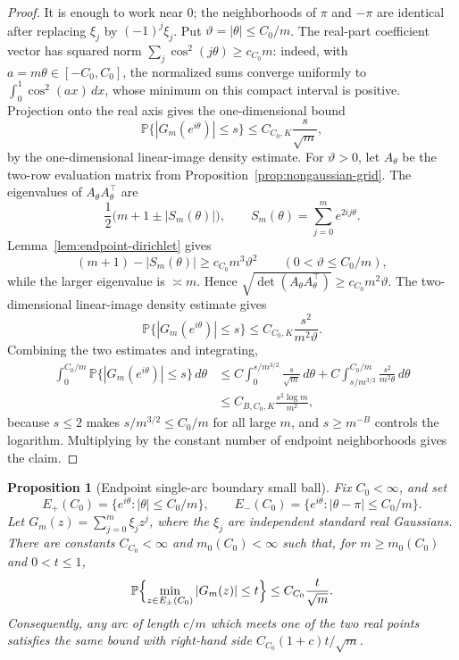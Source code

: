 \documentclass[11pt]{amsart}
\numberwithin{equation}{section}
\newtheorem{proposition}[theorem]{Proposition}
\theoremstyle{definition}
\theoremstyle{remark}
\newcommand{\Prob}{\mathbb P}
\newcommand{\abs}[1]{\left\lvert #1\right\rvert}
\begin{document}
\begin{proof}
It is enough to work near \(0\); the neighborhoods of \(\pi\) and \(-\pi\) are identical after replacing \(\xi_j\) by \((-1)^j\xi_j\). Put \(\vartheta=|\theta|\le C_0/m\). The real-part coefficient vector has squared norm \(\sum_j\cos^2(j\theta)\ge c_{C_0}m\): indeed, with \(a=m\theta\in[-C_0,C_0]\), the normalized sums converge uniformly to \(\int_0^1\cos^2(ax)\,dx\), whose minimum on this compact interval is positive. Projection onto the real axis gives the one-dimensional bound
\[
  \Prob\{\abs{G_m(e^{i\theta})}\le s\}\le C_{C_0,K}\frac{s}{\sqrt m},
\]
by the one-dimensional linear-image density estimate.  For \(\vartheta>0\), let
\(A_\theta\) be the two-row evaluation matrix from
Proposition~\ref{prop:nongaussian-grid}.  The eigenvalues of
\(A_\theta A_\theta^\top\) are
\[
  \frac12\bigl(m+1\pm |S_m(\theta)|\bigr),
  \qquad S_m(\theta)=\sum_{j=0}^m e^{2ij\theta}.
\]
Lemma~\ref{lem:endpoint-dirichlet} gives
\[
  (m+1)-|S_m(\theta)|\ge c_{C_0}m^3\vartheta^2
  \qquad(0<\vartheta\le C_0/m),
\]
while the larger eigenvalue is \(\asymp m\). Hence
\(\sqrt{\det(A_\theta A_\theta^\top)}\ge c_{C_0}m^2\vartheta\).  The
two-dimensional linear-image density estimate gives
\[
  \Prob\{\abs{G_m(e^{i\theta})}\le s\}
  \le C_{C_0,K}\frac{s^2}{m^2\vartheta}.
\]
Combining the two estimates and integrating,
\[
\begin{aligned}
 \int_0^{C_0/m}\Prob\{\abs{G_m(e^{i\theta})}\le s\}\,d\theta
 &\le C\int_0^{s/m^{3/2}}\frac{s}{\sqrt m}\,d\theta
   +C\int_{s/m^{3/2}}^{C_0/m}\frac{s^2}{m^2\theta}\,d\theta  \\
 &\le C_{B,C_0,K}\frac{s^2\log m}{m^2},
\end{aligned}
\]
because \(s\le2\) makes \(s/m^{3/2}\le C_0/m\) for all large \(m\), and \(s\ge m^{-B}\) controls the logarithm. Multiplying by the constant number of endpoint neighborhoods gives the claim.
\end{proof}

\begin{proposition}[Endpoint single-arc boundary small ball]\label{prop:endpoint-singlearc}
Fix \(C_0<\infty\), and set
\[
  E_+(C_0)=\{e^{i\theta}:|\theta|\le C_0/m\},\qquad
  E_-(C_0)=\{e^{i\theta}:|\theta-\pi|\le C_0/m\}.
\]
Let \(G_m(z)=\sum_{j=0}^m\xi_jz^j\), where the \(\xi_j\) are independent
standard real Gaussians.  There are constants \(C_{C_0}<\infty\) and
\(m_0(C_0)<\infty\) such that, for \(m\ge m_0(C_0)\) and \(0<t\le1\),
\[
  \Prob\Bigl\{\min_{z\in E_\pm(C_0)} |G_m(z)|\le t\Bigr\}
  \le C_{C_0}\frac{t}{\sqrt m}.
\]
Consequently, any arc of length \(c/m\) which meets one of the two real points
satisfies the same bound with right-hand side \(C_{C_0}(1+c)t/\sqrt m\).
\end{proposition}
\end{document}

